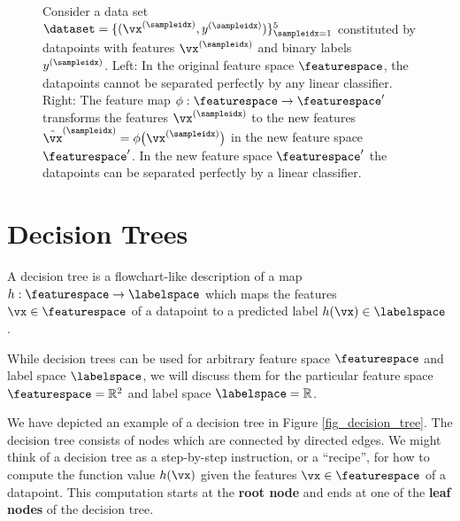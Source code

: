 \documentclass[12pt]{report}
\begin{document}
\begin{figure}[htbp]
\begin{center}
\begin{minipage}{0.45\textwidth}
\begin{tikzpicture}[auto,scale=0.6]
   \end{tikzpicture}
\end{minipage}
\caption{Consider a data set $\dataset = \{ (\vx^{(\sampleidx)},y^{(\sampleidx)}) \}_{\sampleidx=1}^{5}$ constituted 
by datapoints with features $\vx^{(\sampleidx)}$ and binary labels $y^{(\sampleidx)}$. Left: In the original feature 
space $\featurespace$, the datapoints cannot be separated perfectly by any linear classifier. Right: The feature 
map $\phi: \featurespace \rightarrow \featurespace'$ transforms the features $\vx^{(\sampleidx)}$ to the new features 
$\hat{\vx}^{(\sampleidx)}=\phi\big(\vx^{(\sampleidx)}\big)$ in the new feature space $\featurespace'$. In the new 
feature space $\featurespace'$ the datapoints can be separated perfectly by a linear classifier. }
\label{fig_kernelmethods}
\end{center}
\end{figure}


\newpage
\section{Decision Trees} 
\label{sec_decision_trees}

A decision tree is a flowchart-like description of a map 
$h: \featurespace \rightarrow \labelspace$ which maps 
the features $\vx \in \featurespace$ of a datapoint to a 
predicted label $h(\vx) \in \labelspace$ \cite{hastie01statisticallearning}. 

While decision trees can be used for arbitrary feature space 
$\featurespace$ and label space $\labelspace$, we will discuss 
them for the particular feature space $\featurespace = \mathbb{R}^{2}$ 
and label space $\labelspace=\mathbb{R}$. %

We have depicted an example of a decision tree in Figure \ref{fig_decision_tree}. 
The decision tree consists of nodes which are connected by directed edges. 
We might think of a decision tree as a step-by-step instruction, 
or a ``recipe'', for how to compute the function value $h(\vx)$ 
given the features $\vx \in \featurespace$ of a datapoint. This 
computation starts at the {\bf root node} and ends at one of 
the {\bf leaf nodes} of the decision tree. 
\end{document}
